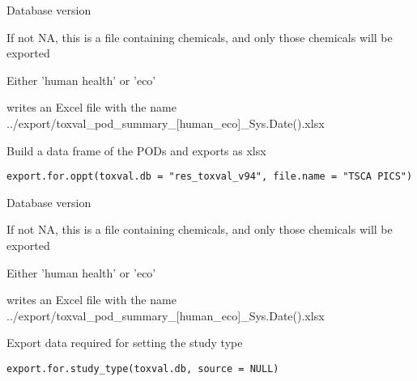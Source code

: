 \documentclass[letterpaper]{book}
\begin{document}
%
\begin{Arguments}
\begin{ldescription}
\item[\code{toxval.db}] Database version

\item[\code{file.name}] If not NA, this is a file containing chemicals, and only those chemicals will be exported

\item[\code{human\_eco}] Either 'human health' or 'eco'
\end{ldescription}
\end{Arguments}
%
\begin{Value}
writes an Excel file with the name
../export/toxval\_pod\_summary\_[human\_eco]\_Sys.Date().xlsx
\end{Value}
%
\begin{Description}\relax
Build a data frame of the PODs and exports as xlsx
\end{Description}
%
\begin{Usage}
\begin{verbatim}
export.for.oppt(toxval.db = "res_toxval_v94", file.name = "TSCA PICS")
\end{verbatim}
\end{Usage}
%
\begin{Arguments}
\begin{ldescription}
\item[\code{toxval.db}] Database version

\item[\code{file.name}] If not NA, this is a file containing chemicals, and only those chemicals will be exported

\item[\code{human\_eco}] Either 'human health' or 'eco'
\end{ldescription}
\end{Arguments}
%
\begin{Value}
writes an Excel file with the name
../export/toxval\_pod\_summary\_[human\_eco]\_Sys.Date().xlsx
\end{Value}
%
\begin{Description}\relax
Export data required for setting the study type
\end{Description}
%
\begin{Usage}
\begin{verbatim}
export.for.study_type(toxval.db, source = NULL)
\end{verbatim}
\end{Usage}
\end{document}
